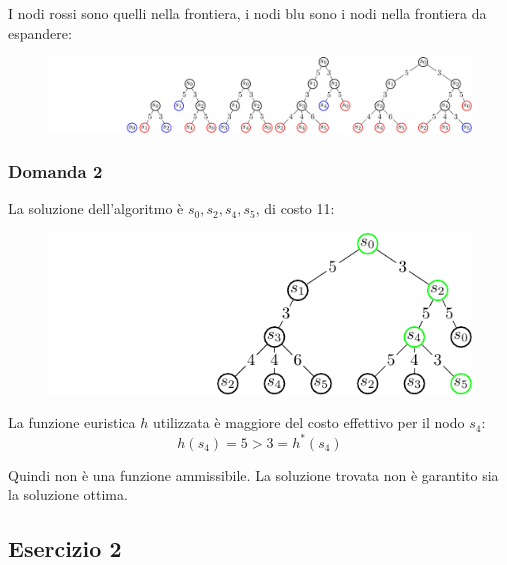 \documentclass{article}
\numberwithin{equation}{section}
\begin{document}

I nodi rossi sono quelli nella frontiera, i nodi blu sono i nodi nella frontiera da espandere:

\begin{figure}[H]%
    \centering%
    \includegraphics[trim={3.9cm 0 0 0}, scale=0.95]{albero_esercitazione_1.pdf}%
\end{figure}

\subsubsection*{Domanda 2}

La soluzione dell'algoritmo è $s_0,s_2,s_4,s_5$, di costo 11:
\begin{figure}[H]%
    \centering%
    \includegraphics[trim={4cm 0 0 0}]{soluzione_esercitazione_1.pdf}%
\end{figure}

La funzione euristica $h$ utilizzata è maggiore del costo effettivo per il nodo $s_4$: 
\begin{equation}
    h(s_4)=5>3=h^*(s_4)
\end{equation}

Quindi non è una funzione ammissibile. La soluzione trovata 
non è garantito sia la soluzione ottima. 

\subsection*{Esercizio 2}
\end{document}
